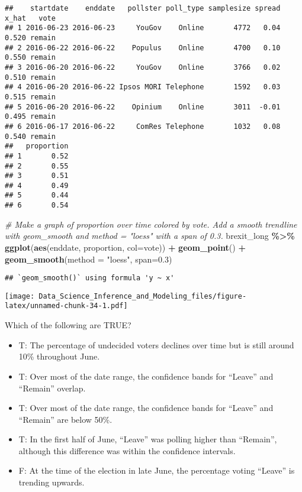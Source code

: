 \documentclass[
]{article}
\newenvironment{Shaded}{\begin{snugshade}}{\end{snugshade}}
\newcommand{\CommentTok}[1]{\textcolor[rgb]{0.56,0.35,0.01}{\textit{#1}}}
\newcommand{\DataTypeTok}[1]{\textcolor[rgb]{0.13,0.29,0.53}{#1}}
\newcommand{\FloatTok}[1]{\textcolor[rgb]{0.00,0.00,0.81}{#1}}
\newcommand{\KeywordTok}[1]{\textcolor[rgb]{0.13,0.29,0.53}{\textbf{#1}}}
\newcommand{\NormalTok}[1]{#1}
\newcommand{\OperatorTok}[1]{\textcolor[rgb]{0.81,0.36,0.00}{\textbf{#1}}}
\newcommand{\StringTok}[1]{\textcolor[rgb]{0.31,0.60,0.02}{#1}}
\providecommand{\tightlist}{%
  \setlength{\itemsep}{0pt}\setlength{\parskip}{0pt}}
\begin{document}
\begin{verbatim}
##    startdate    enddate   pollster poll_type samplesize spread x_hat   vote
## 1 2016-06-23 2016-06-23     YouGov    Online       4772   0.04 0.520 remain
## 2 2016-06-22 2016-06-22    Populus    Online       4700   0.10 0.550 remain
## 3 2016-06-20 2016-06-22     YouGov    Online       3766   0.02 0.510 remain
## 4 2016-06-20 2016-06-22 Ipsos MORI Telephone       1592   0.03 0.515 remain
## 5 2016-06-20 2016-06-22    Opinium    Online       3011  -0.01 0.495 remain
## 6 2016-06-17 2016-06-22     ComRes Telephone       1032   0.08 0.540 remain
##   proportion
## 1       0.52
## 2       0.55
## 3       0.51
## 4       0.49
## 5       0.44
## 6       0.54
\end{verbatim}

\begin{Shaded}
\begin{Highlighting}[]
\CommentTok{\# Make a graph of proportion over time colored by vote. Add a smooth trendline with geom\_smooth and method = "loess" with a span of 0.3.}
\NormalTok{brexit\_long }\OperatorTok{\%\textgreater{}\%}
\StringTok{  }\KeywordTok{ggplot}\NormalTok{(}\KeywordTok{aes}\NormalTok{(enddate, proportion, }\DataTypeTok{col=}\NormalTok{vote)) }\OperatorTok{+}
\StringTok{  }\KeywordTok{geom\_point}\NormalTok{() }\OperatorTok{+}
\StringTok{  }\KeywordTok{geom\_smooth}\NormalTok{(}\DataTypeTok{method =} \StringTok{"loess"}\NormalTok{, }\DataTypeTok{span=}\FloatTok{0.3}\NormalTok{)}
\end{Highlighting}
\end{Shaded}

\begin{verbatim}
## `geom_smooth()` using formula 'y ~ x'
\end{verbatim}

\texttt{[image: Data\_Science\_Inference\_and\_Modeling\_files/figure-latex/unnamed-chunk-34-1.pdf]}

Which of the following are TRUE?

\begin{itemize}
\tightlist
\item
  T: The percentage of undecided voters declines over time but is still
  around 10\% throughout June.
\item
  T: Over most of the date range, the confidence bands for ``Leave'' and
  ``Remain'' overlap.
\item
  T: Over most of the date range, the confidence bands for ``Leave'' and
  ``Remain'' are below 50\%.
\item
  T: In the first half of June, ``Leave'' was polling higher than
  ``Remain'', although this difference was within the confidence
  intervals.
\item
  F: At the time of the election in late June, the percentage voting
  ``Leave'' is trending upwards.
\end{itemize}
\end{document}
